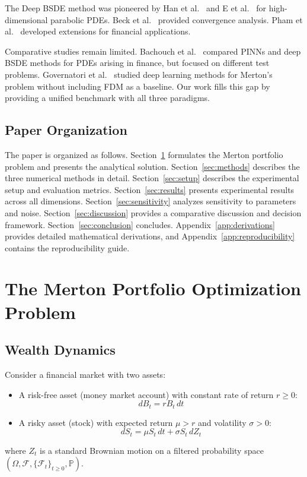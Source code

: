 \documentclass[12pt,a4paper]{article}
\begin{document}
The Deep BSDE method was pioneered by Han et al.~\cite{han2018} and E et al.~\cite{e2017} for high-dimensional parabolic PDEs. Beck et al.~\cite{beck2019} provided convergence analysis. Pham et al.~\cite{pham2021} developed extensions for financial applications.

Comparative studies remain limited. Bachouch et al.~\cite{bachouch2022} compared PINNs and deep BSDE methods for PDEs arising in finance, but focused on different test problems. Governatori et al.~\cite{governatori2024} studied deep learning methods for Merton's problem without including FDM as a baseline. Our work fills this gap by providing a unified benchmark with all three paradigms.

\subsection{Paper Organization}

The paper is organized as follows. Section~\ref{sec:problem} formulates the Merton portfolio problem and presents the analytical solution. Section~\ref{sec:methods} describes the three numerical methods in detail. Section~\ref{sec:setup} describes the experimental setup and evaluation metrics. Section~\ref{sec:results} presents experimental results across all dimensions. Section~\ref{sec:sensitivity} analyzes sensitivity to parameters and noise. Section~\ref{sec:discussion} provides a comparative discussion and decision framework. Section~\ref{sec:conclusion} concludes. Appendix~\ref{app:derivations} provides detailed mathematical derivations, and Appendix~\ref{app:reproducibility} contains the reproducibility guide.

\section{The Merton Portfolio Optimization Problem}
\label{sec:problem}

\subsection{Wealth Dynamics}

Consider a financial market with two assets:
\begin{itemize}
    \item A risk-free asset (money market account) with constant rate of return $r \ge 0$: $$dB_t = r B_t \, dt$$
    \item A risky asset (stock) with expected return $\mu > r$ and volatility $\sigma > 0$: $$dS_t = \mu S_t \, dt + \sigma S_t \, dZ_t$$
\end{itemize}
where $Z_t$ is a standard Brownian motion on a filtered probability space $(\Omega, \mathcal{F}, \{\mathcal{F}_t\}_{t\ge 0}, \mathbb{P})$.
\end{document}
